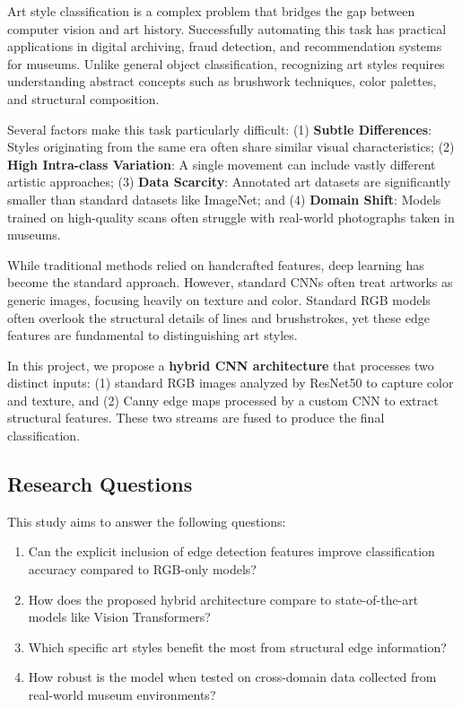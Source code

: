 \documentclass[conference]{IEEEtran}
\begin{document}
Art style classification is a complex problem that bridges the gap between computer vision and art history. Successfully automating this task has practical applications in digital archiving, fraud detection, and recommendation systems for museums. Unlike general object classification, recognizing art styles requires understanding abstract concepts such as brushwork techniques, color palettes, and structural composition.

Several factors make this task particularly difficult: (1) \textbf{Subtle Differences}: Styles originating from the same era often share similar visual characteristics; (2) \textbf{High Intra-class Variation}: A single movement can include vastly different artistic approaches; (3) \textbf{Data Scarcity}: Annotated art datasets are significantly smaller than standard datasets like ImageNet; and (4) \textbf{Domain Shift}: Models trained on high-quality scans often struggle with real-world photographs taken in museums.

While traditional methods relied on handcrafted features, deep learning has become the standard approach. However, standard CNNs often treat artworks as generic images, focusing heavily on texture and color. Standard RGB models often overlook the structural details of lines and brushstrokes, yet these edge features are fundamental to distinguishing art styles.

In this project, we propose a \textbf{hybrid CNN architecture} that processes two distinct inputs: (1) standard RGB images analyzed by ResNet50 to capture color and texture, and (2) Canny edge maps processed by a custom CNN to extract structural features. These two streams are fused to produce the final classification.

\subsection{Research Questions}

This study aims to answer the following questions:
\begin{enumerate}
    \item Can the explicit inclusion of edge detection features improve classification accuracy compared to RGB-only models?
    \item How does the proposed hybrid architecture compare to state-of-the-art models like Vision Transformers?
    \item Which specific art styles benefit the most from structural edge information?
    \item How robust is the model when tested on cross-domain data collected from real-world museum environments?
\end{enumerate}
\end{document}
